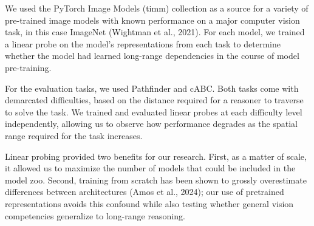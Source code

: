 \documentclass[10pt,letterpaper]{article}
\begin{document}
We used the PyTorch Image Models (timm) collection as a source for a variety of pre-trained image models with known performance on a major computer vision task, in this case ImageNet (Wightman et al., 2021). For each model, we trained a linear probe on the model's representations from each task to determine whether the model had learned long-range dependencies in the course of model pre-training.

For the evaluation tasks, we used Pathfinder and cABC. Both tasks come with demarcated difficulties, based on the distance required for a reasoner to traverse to solve the task. We trained and evaluated linear probes at each difficulty level independently, allowing us to observe how performance degrades as the spatial range required for the task increases.

Linear probing provided two benefits for our research. First, as a matter of scale, it allowed us to maximize the number of models that could be included in the model zoo. Second, training from scratch has been shown to grossly overestimate differences between architectures (Amos et al., 2024); our use of pretrained representations avoids this confound while also testing whether general vision competencies generalize to long-range reasoning.
\end{document}
